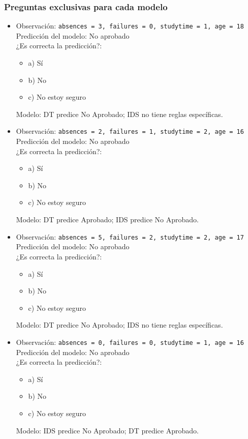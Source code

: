 \subsubsection*{Preguntas exclusivas para cada modelo}
\begin{itemize}
    \item Observación: \texttt{absences = 3, failures = 0, studytime = 1, age = 18}\\
    Predicción del modelo: No aprobado\\
    ¿Es correcta la predicción?:
    \begin{itemize}
        \item a) Sí
        \item b) No
        \item c) No estoy seguro
    \end{itemize}
    Modelo: DT predice No Aprobado; IDS no tiene reglas específicas.

    \item Observación: \texttt{absences = 2, failures = 1, studytime = 2, age = 16}\\
    Predicción del modelo: No aprobado\\
    ¿Es correcta la predicción?:
    \begin{itemize}
        \item a) Sí
        \item b) No
        \item c) No estoy seguro
    \end{itemize}
    Modelo: DT predice Aprobado; IDS predice No Aprobado.

    \item Observación: \texttt{absences = 5, failures = 2, studytime = 2, age = 17}\\
    Predicción del modelo: No aprobado\\
    ¿Es correcta la predicción?:
    \begin{itemize}
        \item a) Sí
        \item b) No
        \item c) No estoy seguro
    \end{itemize}
    Modelo: DT predice No Aprobado; IDS no tiene reglas específicas.

    \item Observación: \texttt{absences = 0, failures = 0, studytime = 1, age = 16}\\
    Predicción del modelo: No aprobado\\
    ¿Es correcta la predicción?:
    \begin{itemize}
        \item a) Sí
        \item b) No
        \item c) No estoy seguro
    \end{itemize}
    Modelo: IDS predice No Aprobado; DT predice Aprobado.
\end{itemize}

